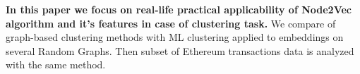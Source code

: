 \textbf{In this paper we focus on real-life practical applicability of Node2Vec algorithm and it's features in case of clustering task.} We compare of graph-based clustering methods with ML clustering applied to embeddings on several Random Graphs. Then subset of Ethereum transactions data is analyzed with the same method.